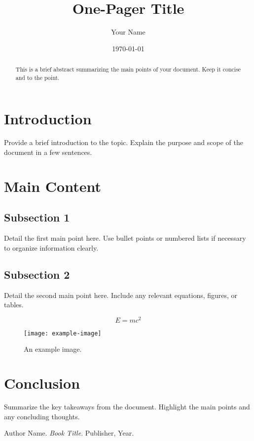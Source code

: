 \documentclass[a3paper, 11pt]{article}
\begin{document}
\title{One-Pager Title}
\author{Your Name}
\date{\today}
\maketitle

\begin{abstract}
	This is a brief abstract summarizing the main points of your document. Keep it concise and to the point.
\end{abstract}

\section{Introduction}
Provide a brief introduction to the topic. Explain the purpose and scope of the document in a few sentences.

\section{Main Content}
\subsection{Subsection 1}
Detail the first main point here. Use bullet points or numbered lists if necessary to organize information clearly.

\subsection{Subsection 2}
Detail the second main point here. Include any relevant equations, figures, or tables.

\begin{equation}
	E = mc^2
\end{equation}

\begin{figure}[h]
	\centering
	\texttt{[image: example-image]}
	\caption{An example image.}
	\label{fig:example}
\end{figure}

\section{Conclusion}
Summarize the key takeaways from the document. Highlight the main points and any concluding thoughts.

\begin{thebibliography}{9}
	Author Name. \textit{Book Title}. Publisher, Year.
\end{thebibliography}
\end{document}
